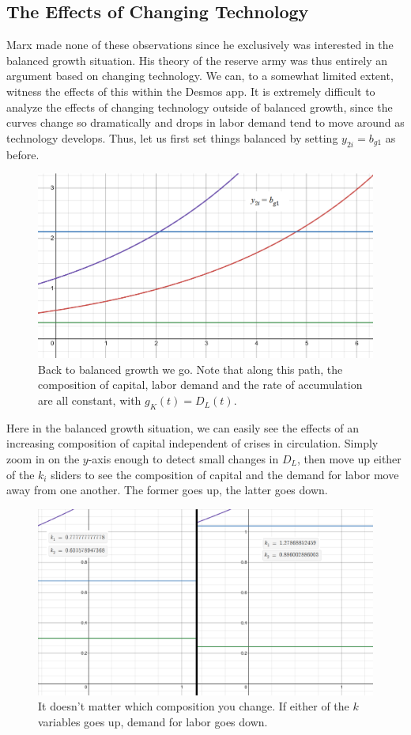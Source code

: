 \documentclass{article}
\theoremstyle{theorem}
\begin{document}
\subsection{The Effects of Changing Technology}
Marx made none of these observations since he exclusively was interested in the balanced growth situation. His theory of the reserve army was thus entirely an argument based on changing technology. We can, to a somewhat limited extent, witness the effects of this within the Desmos app. It is extremely difficult to analyze the effects of changing technology outside of balanced growth, since the curves change so dramatically and drops in labor demand tend to move around as technology develops. Thus, let us first set things balanced by setting $y_{2i} = b_{g1}$ as before.
\begin{figure}[H]
\centering
\includegraphics[scale=.7]{Images/backToBalanced}
\caption{Back to balanced growth we go. Note that along this path, the composition of capital, labor demand and the rate of accumulation are all constant, with $g_K(t) = D_L(t)$.}
\end{figure}
Here in the balanced growth situation, we can easily see the effects of an increasing composition of capital independent of crises in circulation. Simply zoom in on the $y$-axis enough to detect small changes in $D_L$, then move up either of the $k_i$ sliders to see the composition of capital and the demand for labor move away from one another. The former goes up, the latter goes down.
\begin{figure}[H]
\centering
\includegraphics[scale=.5]{Images/fallingDemand}
\caption{It doesn't matter which composition you change. If either of the $k$ variables goes up, demand for labor goes down.}
\end{figure}
\end{document}
